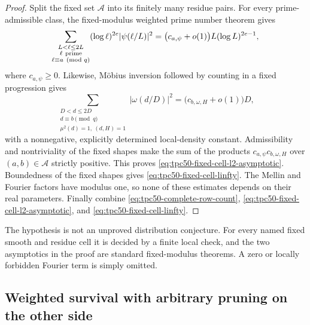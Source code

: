 \begin{proof}
Split the fixed set \(\mathcal A\) into its finitely many residue pairs.
For every prime-admissible class, the fixed-modulus weighted prime
number theorem gives \citep{IwaniecKowalski2004}
\begin{equation}
 \sum_{\substack{L<\ell\leq2L\\
                  \ell\ {\rm prime}\\
                  \ell\equiv a\pmod q}}
 (\log\ell)^{2e}|\psi(\ell/L)|^2
 =\bigl(c_{a,\psi}+o(1)\bigr)
 L(\log L)^{2e-1},
 \label{eq:tpc50-weighted-prime-energy}
\end{equation}
where \(c_{a,\psi}\geq0\).  Likewise, M\"obius inversion followed by
counting in a fixed progression gives
\begin{equation}
 \sum_{\substack{D<d\leq2D\\
                  d\equiv b\pmod q\\
                  \mu^2(d)=1,\ (d,H)=1}}
 |\omega(d/D)|^2
 =\bigl(c_{b,\omega,H}+o(1)\bigr)D,
 \label{eq:tpc50-weighted-squarefree-energy}
\end{equation}
with a nonnegative, explicitly determined local-density constant.
Admissibility and nontriviality of the fixed shapes make the sum of the
products \(c_{a,\psi}c_{b,\omega,H}\) over
\((a,b)\in\mathcal A\) strictly positive.  This proves
\eqref{eq:tpc50-fixed-cell-l2-asymptotic}.  Boundedness of the fixed
shapes gives \eqref{eq:tpc50-fixed-cell-linfty}.  The Mellin and Fourier
factors have modulus one, so none of these estimates depends on their
real parameters.  Finally combine
\eqref{eq:tpc50-complete-row-count},
\eqref{eq:tpc50-fixed-cell-l2-asymptotic}, and
\eqref{eq:tpc50-fixed-cell-linfty}.
\end{proof}

The hypothesis is not an unproved distribution conjecture.  For every
named fixed smooth and residue cell it is decided by a finite local check,
and the two asymptotics in the proof are standard fixed-modulus
theorems.  A zero or locally forbidden Fourier term is simply omitted.

\subsection{Weighted survival with arbitrary pruning on the other side}

